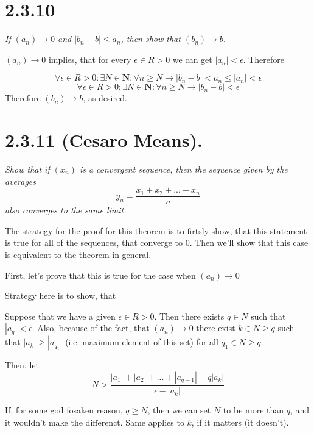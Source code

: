 \documentclass[11pt,oneside,titlepage]{book}
\begin{document}
\section*{2.3.10}
\textit{If $(a_n) \to 0$ and $|b_n - b| \leq a_n$, then show that $(b_n) \to b$.}

$(a_n) \to 0$ implies, that for every $\epsilon \in R > 0$ we can get
$|a_n| < \epsilon$. Therefore

$$\forall \epsilon \in R > 0: \exists N \in \textbf{N}: \forall n \geq N \to
|b_n - b| < a_n \leq |a_n| < \epsilon$$
$$\forall \epsilon \in R > 0: \exists N \in \textbf{N}: \forall n \geq N \to
|b_n - b|  < \epsilon$$
Therefore $(b_n) \to b$, as desired.

\section*{2.3.11 (Cesaro Means).}
\textit{Show that if $(x_n)$ is a convergent sequence, then the sequence given by
  the averages }
$$y_n = \frac{x_1 + x_2 + ... + x_n}{n}$$
\textit{also converges to the same limit.}

The strategy for the proof for this theorem  is to firtsly show, that this
statement is true for all of the sequences, that converge to
0. Then we'll show that this case is equivalent to the theorem in general.

First, let's prove that this is true for the case when  $(a_n) \to 0$

Strategy here is to show, that 

Suppose that we have a given $\epsilon \in R > 0$. Then there exists
$q \in N$ such that  $|a_q| < \epsilon$. Also, because of the fact,
that $(a_n) \to 0$ there exist  $ k \in N \geq q$
such that $|a_k| \geq |a_{q_1}|$ (i.e. maximum element of this set)
for all $q_1 \in N \geq q$.

Then, let
$$ N > \frac{|a_1| + |a_2| +  ... + |a_{q - 1}| - q|a_k|}{\epsilon -   |a_k|}$$

If, for some god fosaken reason, $q \geq N$, then we can set $N$ to be more
than $q$, and it wouldn't make the differenct. Same applies to $k$, if it
matters (it doesn't).
\end{document}

